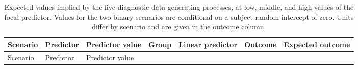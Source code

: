 \documentclass[
  man,
  floatsintext,
  longtable,
  nolmodern,
  notxfonts,
  notimes,
  colorlinks=true,linkcolor=blue,citecolor=blue,urlcolor=blue]{apa7}
\begin{document}
\begin{longtable}[]{@{}
  >{\raggedright\arraybackslash}p{}
  >{\raggedright\arraybackslash}p{}
  >{\raggedright\arraybackslash}p{}
  >{\raggedright\arraybackslash}p{}
  >{\raggedright\arraybackslash}p{}
  >{\raggedright\arraybackslash}p{}
  >{\raggedright\arraybackslash}p{}@{}}
\caption{Expected values implied by the five diagnostic data-generating
processes, at low, middle, and high values of the focal predictor.
Values for the two binary scenarios are conditional on a subject random
intercept of zero. Units differ by scenario and are given in the outcome
column.}\label{tbl-diagnostic-scenario-values}\tabularnewline
\toprule\noalign{}
\begin{minipage}[b]{\linewidth}\raggedright
Scenario
\end{minipage} & \begin{minipage}[b]{\linewidth}\raggedright
Predictor
\end{minipage} & \begin{minipage}[b]{\linewidth}\raggedright
Predictor value
\end{minipage} & \begin{minipage}[b]{\linewidth}\raggedright
Group
\end{minipage} & \begin{minipage}[b]{\linewidth}\raggedright
Linear predictor
\end{minipage} & \begin{minipage}[b]{\linewidth}\raggedright
Outcome
\end{minipage} & \begin{minipage}[b]{\linewidth}\raggedright
Expected outcome
\end{minipage} \\
\midrule\noalign{}
\endfirsthead
\toprule\noalign{}
\begin{minipage}[b]{\linewidth}\raggedright
Scenario
\end{minipage} & \begin{minipage}[b]{\linewidth}\raggedright
Predictor
\end{minipage} & \begin{minipage}[b]{\linewidth}\raggedright
Predictor value
\end{minipage} & \begin{minipage}[b]{\linewidth}\raggedright

\end{minipage}
\end{longtable}
\end{document}
